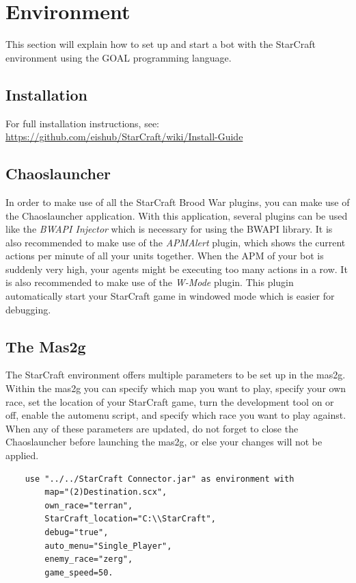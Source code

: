 \chapter{Environment}
This section will explain how to set up and start a bot with the StarCraft environment using the GOAL programming language.

\section{Installation}
For full installation instructions, see: \url{https://github.com/eishub/StarCraft/wiki/Install-Guide}

\section{Chaoslauncher}
In order to make use of all the StarCraft Brood War plugins, you can make use of the Chaoslauncher application. With this application, several plugins can be used like the \textit{BWAPI Injector} which is necessary for using the BWAPI library. It is also recommended to make use of the \textit{APMAlert} plugin, which shows the current actions per minute of all your units together. When the APM of your bot is suddenly very high, your agents might be executing too many actions in a row. It is also recommended to make use of the \textit{W-Mode} plugin. This plugin automatically start your StarCraft game in windowed mode which is easier for debugging.

\section{The Mas2g}
\label{mas2g}
The StarCraft environment offers multiple parameters to be set up in the mas2g. Within the mas2g you can specify which map you want to play, specify your own race, set the location of your StarCraft game, turn the development tool on or off, enable the automenu script, and specify which race you want to play against. When any of these parameters are updated, do not forget to close the Chaoslauncher before launching the mas2g, or else your changes will not be applied.

\begin{verbatim}
    use "../../StarCraft Connector.jar" as environment with
        map="(2)Destination.scx",
        own_race="terran",
        StarCraft_location="C:\\StarCraft",
        debug="true",
        auto_menu="Single_Player",
        enemy_race="zerg",
        game_speed=50.
\end{verbatim}

